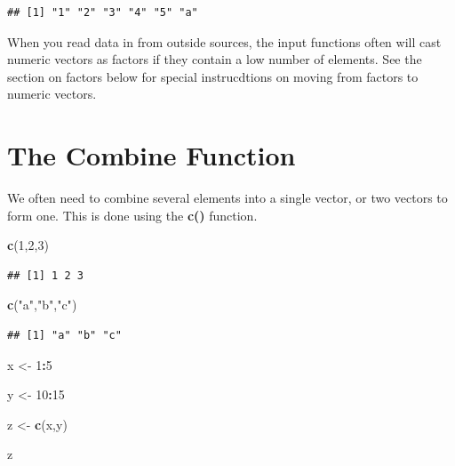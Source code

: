 \documentclass[]{book}
\newenvironment{Shaded}{\begin{snugshade}}{\end{snugshade}}
\newcommand{\DecValTok}[1]{\textcolor[rgb]{0.00,0.00,0.81}{#1}}
\newcommand{\KeywordTok}[1]{\textcolor[rgb]{0.13,0.29,0.53}{\textbf{#1}}}
\newcommand{\NormalTok}[1]{#1}
\newcommand{\OperatorTok}[1]{\textcolor[rgb]{0.81,0.36,0.00}{\textbf{#1}}}
\newcommand{\StringTok}[1]{\textcolor[rgb]{0.31,0.60,0.02}{#1}}
\theoremstyle{definition}
\theoremstyle{definition}
\theoremstyle{definition}
\theoremstyle{remark}
\begin{document}
\begin{verbatim}
## [1] "1" "2" "3" "4" "5" "a"
\end{verbatim}

When you read data in from outside sources, the input functions often
will cast numeric vectors as factors if they contain a low number of
elements. See the section on factors below for special instrucdtions on
moving from factors to numeric vectors.

\hypertarget{the-combine-function}{%
\section{The Combine Function}\label{the-combine-function}}

We often need to combine several elements into a single vector, or two
vectors to form one. This is done using the \textbf{c()} function.

\begin{Shaded}
\begin{Highlighting}[]
\KeywordTok{c}\NormalTok{(}\DecValTok{1}\NormalTok{,}\DecValTok{2}\NormalTok{,}\DecValTok{3}\NormalTok{)}
\end{Highlighting}
\end{Shaded}

\begin{verbatim}
## [1] 1 2 3
\end{verbatim}

\begin{Shaded}
\begin{Highlighting}[]
\KeywordTok{c}\NormalTok{(}\StringTok{"a"}\NormalTok{,}\StringTok{"b"}\NormalTok{,}\StringTok{"c"}\NormalTok{)}
\end{Highlighting}
\end{Shaded}

\begin{verbatim}
## [1] "a" "b" "c"
\end{verbatim}

\begin{Shaded}
\begin{Highlighting}[]
\NormalTok{x <-}\StringTok{ }\DecValTok{1}\OperatorTok{:}\DecValTok{5}

\NormalTok{y <-}\StringTok{ }\DecValTok{10}\OperatorTok{:}\DecValTok{15}

\NormalTok{z <-}\StringTok{ }\KeywordTok{c}\NormalTok{(x,y)}

\NormalTok{z}
\end{Highlighting}
\end{Shaded}
\end{document}

